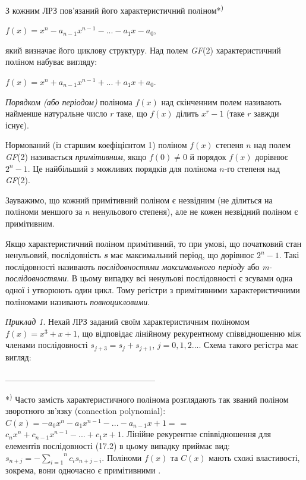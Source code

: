 \documentclass[a4paper]{article}
\newcounter{}
\begin{document}
\bigskip


\bigskip

З кожним ЛРЗ пов’язаний його характеристичний поліном*\textsuperscript{)}

{\centering
 ${f(x)=x^{{n}}-a_{{n-1}}x^{{n-1}}-\text{.}\text{.}\text{.}-a_{{1}}x-a_{{0}}}$,
\par}

який визначає його циклову структуру. Над полем \textit{GF}(2) характеристичний
поліном набуває вигляду:

{\centering
 ${f(x)=x^{{n}}+a_{{n-1}}x^{{n-1}}+\text{.}\text{.}\text{.}+a_{{1}}x+a_{{0}}}$.
\par}

\textit{Порядком (або періодом)} полінома  ${f(x)}$  над скінченним полем
називають найменше натуральне число  ${r}$ таке, що  ${f(x)}$ ділить 
${x^{{r}}-1}$ (таке  ${r}$ завжди існує).

Нормований (із старшим коефіцієнтом 1) поліном  ${f(x)}$ степеня  ${n}$ над
полем \textit{GF}(2) називається \textit{примітивним}, якщо  ${f(0)\neq 0}$ й
порядок  ${f(x)}$ дорівнює  ${2^{{n}}-1}$. Це найбільший з можливих порядків
для полінома  ${n}${}-го степеня над \textit{GF}(2). $ $

Зауважимо, що кожний примітивний поліном є незвідним (не ділиться на поліноми
меншого за  ${n}$ ненульового степеня), але не кожен незвідний поліном є
примітивним.

Якщо характеристичний поліном примітивний, то при умові, що початковий стан
ненульовий, послідовність \textbf{\textit{s}} має максимальний період, що
дорівнює  ${2^{{n}}-1}$. Такі послідовності називають \textit{послідовностями
максимального періоду }або\textit{ }\textit{m}\textit{{}-послідовностями}. В
цьому випадку всі ненульові послідовності є зсувами одна одної і утворюють один
цикл. Тому регістри з примітивними характеристичними поліномами називають
\textit{повноцикловими}.\textbf{ }

\textit{Приклад 1}. Нехай ЛРЗ заданий своїм характеристичним поліномом 
${f(x)=x^{{3}}+x+1}$, що відповідає лінійному рекурентному співвідношенню між
членами послідовності  ${s_{{j+3}}=s_{{j}}+s_{{j+1}}}$,
${j=0,1,2\text{.}\text{.}\text{.}}$. Схема такого регістра має вигляд:


\bigskip

\_\_\_\_\_\_\_\_\_\_\_\_\_\_\_\_\_\_\_\_\_\_\_\_

*\textsuperscript{)} Часто замість характеристичного полінома розглядають так
званий поліном зворотного зв’язку (сonnection polynomial): 
${C(x)=-a_{{0}}x^{{n}}-a_{{1}}x^{{n-1}}-\text{.}\text{.}\text{.}-a_{{n-1}}x+1=}$
= ${c_{{n}}x^{{n}}+c_{{n-1}}x^{{n-1}}-\text{.}\text{.}\text{.}+c_{{1}}x+1}$.
Лінійне рекурентне співвідношення для елементів послідовності  (17.2) в цьому
випадку приймає вид:  ${s_{{n+j}}=-\overset{{n}}{\underset{{i=1}}{\sum
}}{c_{{i}}s_{{n+j-i}}}}$. Поліноми  ${f(x)}$ та  ${C(x)}$ мають схожі
властивості, зокрема, вони одночасно є примітивними .
\end{document}

